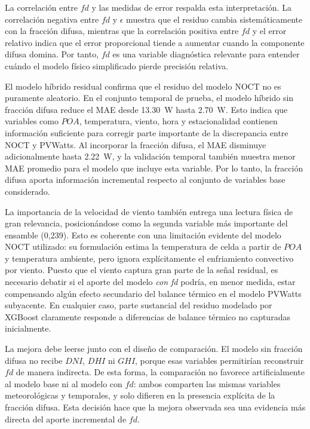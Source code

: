 \documentclass[12pt, letterpaper]{article}
\begin{document}
La correlaci\'on entre \(fd\) y las medidas de error respalda esta interpretaci\'on. La correlaci\'on negativa entre \(fd\) y \(\epsilon\) muestra que el residuo cambia sistem\'aticamente con la fracci\'on difusa, mientras que la correlaci\'on positiva entre \(fd\) y el error relativo indica que el error proporcional tiende a aumentar cuando la componente difusa domina. Por tanto, \(fd\) es una variable diagn\'ostica relevante para entender cu\'ando el modelo f\'isico simplificado pierde precisi\'on relativa.

El modelo h\'ibrido residual confirma que el residuo del modelo NOCT no es puramente aleatorio. En el conjunto temporal de prueba, el modelo h\'ibrido sin fracci\'on difusa reduce el MAE desde \SI{13.30}{\watt} hasta \SI{2.70}{\watt}. Esto indica que variables como \(POA\), temperatura, viento, hora y estacionalidad contienen informaci\'on suficiente para corregir parte importante de la discrepancia entre NOCT y PVWatts. Al incorporar la fracci\'on difusa, el MAE disminuye adicionalmente hasta \SI{2.22}{\watt}, y la validaci\'on temporal tambi\'en muestra menor MAE promedio para el modelo que incluye esta variable. Por lo tanto, la fracci\'on difusa aporta informaci\'on incremental respecto al conjunto de variables base considerado.

La importancia de la velocidad de viento tambi\'en entrega una lectura f\'isica de gran relevancia, posicion\'andose como la segunda variable m\'as importante del ensamble (0,239). Esto es coherente con una limitaci\'on evidente del modelo NOCT utilizado: su formulaci\'on estima la temperatura de celda a partir de \(POA\) y temperatura ambiente, pero ignora expl\'icitamente el enfriamiento convectivo por viento. Puesto que el viento captura gran parte de la se\~nal residual, es necesario debatir si el aporte del modelo \textit{con fd} podr\'ia, en menor medida, estar compensando alg\'un efecto secundario del balance t\'ermico en el modelo PVWatts subyacente. En cualquier caso, parte sustancial del residuo modelado por XGBoost claramente responde a diferencias de balance t\'ermico no capturadas inicialmente.

La mejora debe leerse junto con el dise\~no de comparaci\'on. El modelo sin fracci\'on difusa no recibe \(DNI\), \(DHI\) ni \(GHI\), porque esas variables permitir\'ian reconstruir \(fd\) de manera indirecta. De esta forma, la comparaci\'on no favorece artificialmente al modelo base ni al modelo con \(fd\): ambos comparten las mismas variables meteorol\'ogicas y temporales, y solo difieren en la presencia expl\'icita de la fracci\'on difusa. Esta decisi\'on hace que la mejora observada sea una evidencia m\'as directa del aporte incremental de \(fd\).
\end{document}
